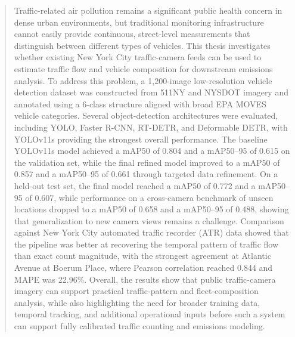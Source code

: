 \begin{abstract}
    Traffic-related air pollution remains a significant public health concern in 
    dense urban environments, but traditional monitoring infrastructure cannot 
    easily provide continuous, street-level measurements that distinguish between 
    different types of vehicles. This 
    thesis investigates whether existing New York City traffic-camera feeds can 
    be used to estimate traffic flow and vehicle composition for downstream emissions
    analysis. To address this problem, a 1,200-image low-resolution vehicle detection 
    dataset was constructed from 511NY and NYSDOT imagery and annotated using a 
    6-class structure aligned with broad EPA MOVES vehicle categories. Several 
    object-detection architectures were evaluated, including YOLO, Faster R-CNN, 
    RT-DETR, and Deformable DETR, with YOLOv11s providing the strongest overall 
    performance. The baseline YOLOv11s model achieved a mAP50 of 0.804 and a mAP50--95 
    of 0.615 on the validation set, while the final refined model improved to a 
    mAP50 of 0.857 and a mAP50--95 of 0.661 through targeted data refinement. On a 
    held-out test set, the final model reached a mAP50 of 0.772 and a mAP50--95 of
    0.607, while performance on a cross-camera benchmark of unseen locations dropped
    to a mAP50 of 0.658 and a mAP50--95 of 0.488, showing that generalization to new 
    camera views remains a challenge. Comparison against New York City automated 
    traffic recorder (ATR) data showed that the pipeline was better at recovering 
    the temporal pattern of traffic flow than exact count magnitude, with the 
    strongest agreement at Atlantic Avenue at Boerum Place, where Pearson correlation
    reached 0.844 and MAPE was 22.96\%. Overall, the results show that public 
    traffic-camera imagery can support practical traffic-pattern and fleet-composition
    analysis, while also highlighting the need for broader training data, temporal 
    tracking, and additional operational inputs before such a system can support 
    fully calibrated traffic counting and emissions modeling.
\end{abstract}

